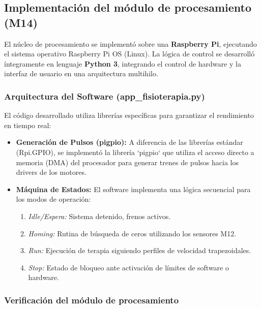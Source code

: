 \subsection{Implementación del módulo de procesamiento (M14)}
El núcleo de procesamiento se implementó sobre una \textbf{Raspberry Pi}, ejecutando el sistema operativo Raspberry Pi OS (Linux). La lógica de control se desarrolló íntegramente en lenguaje \textbf{Python 3}, integrando el control de hardware y la interfaz de usuario en una arquitectura multihilo.

\subsubsection{Arquitectura del Software (app\_fisioterapia.py)}
El código desarrollado utiliza librerías específicas para garantizar el rendimiento en tiempo real:
\begin{itemize}
	\item \textbf{Generación de Pulsos (pigpio):} A diferencia de las librerías estándar (Rpi.GPIO), se implementó la librería `pigpio` que utiliza el acceso directo a memoria (DMA) del procesador para generar trenes de pulsos hacia los drivers de los motores.
	\item \textbf{Máquina de Estados:} El software implementa una lógica secuencial para los modos de operación:
	\begin{enumerate}
		\item \textit{Idle/Espera:} Sistema detenido, frenos activos.
		\item \textit{Homing:} Rutina de búsqueda de ceros utilizando los sensores M12.
		\item \textit{Run:} Ejecución de terapia siguiendo perfiles de velocidad trapezoidales.
		\item \textit{Stop:} Estado de bloqueo ante activación de límites de software o hardware.
	\end{enumerate}
\end{itemize}

\subsubsection{Verificación del módulo de procesamiento}
